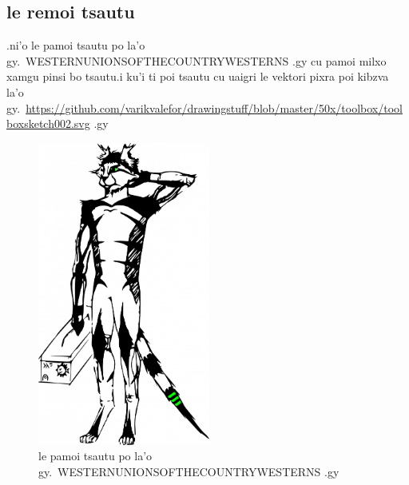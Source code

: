 \documentclass{report}
\newcommand\imageheight{10cm}
\begin{document}
\subsection{le remoi tsautu}
.ni'o le pamoi tsautu po la'o gy.\ WESTERNUNIONSOFTHECOUNTRYWESTERNS .gy cu pamoi milxo xamgu pinsi bo tsautu\@  .i ku'i ti poi tsautu cu uaigri le vektori pixra poi kibzva la'o gy.\ \url{https://github.com/varikvalefor/drawingstuff/blob/master/50x/toolbox/toolboxsketch002.svg} .gy
\begin{figure}[ht]
	\centering
	\includegraphics[height=\imageheight]{50x/toolbox/s1v2.jpg}
	\caption[center]{le pamoi tsautu po la'o gy.\ WESTERNUNIONSOFTHECOUNTRYWESTERNS .gy}
\end{figure}
\end{document}
